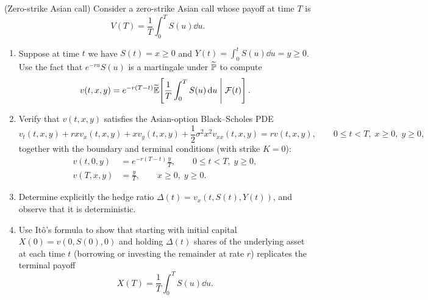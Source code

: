\begin{problem}
    (Zero-strike Asian call) Consider a zero-strike Asian call whose payoff at time $T$ is
    \[
    V(T) = \frac{1}{T}\int_0^T S(u)\dd u.
    \]
    \begin{enumerate}
        \item Suppose at time $t$ we have $S(t) = x \geq 0$ and $Y(t) = \int_0^t S(u)\dd u = y \geq 0$. Use the fact that $e^{-ru} S(u)$ is a martingale under $\widetilde{\mathbb{P}}$ to compute
        \[
        v(t, x, y) = e^{-r(T - t)}\widetilde{\mathbb{E}}\!\left[\frac{1}{T}\int_0^T S(u)\,\mathrm{d} u \;\middle|\; \mathcal{F}(t)\right].
        \]
        \item Verify that $v(t, x, y)$ satisfies the Asian-option Black--Scholes PDE
        \[
        v_t(t, x, y) + r x v_x(t, x, y) + x v_y(t, x, y) + \frac{1}{2}\sigma^2 x^2 v_{xx}(t, x, y) = r v(t, x, y), \qquad 0 \leq t < T,\; x \geq 0,\; y \geq 0,
        \]
        together with the boundary and terminal conditions (with strike $K = 0$):
        \begin{align*}
        v(t, 0, y) &= e^{-r(T - t)}\frac{y}{T}, \qquad 0 \leq t < T,\; y \geq 0, \\
        v(T, x, y) &= \frac{y}{T}, \qquad x \geq 0,\; y \geq 0.
        \end{align*}
        \item Determine explicitly the hedge ratio $\Delta(t) = v_x(t, S(t), Y(t))$, and observe that it is deterministic.
        \item Use It\^o's formula to show that starting with initial capital $X(0) = v(0, S(0), 0)$ and holding $\Delta(t)$ shares of the underlying asset at each time $t$ (borrowing or investing the remainder at rate $r$) replicates the terminal payoff
        \[
        X(T) = \frac{1}{T}\int_0^T S(u)\dd u.
        \]
    \end{enumerate}
\end{problem}

